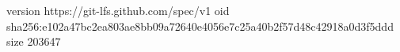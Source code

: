 version https://git-lfs.github.com/spec/v1
oid sha256:e102a47bc2ea803ae8bb09a72640e4056e7c25a40b2f57d48c42918a0d3f5ddd
size 203647
